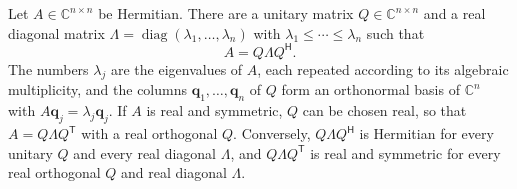 \begin{theorem}
\label{thm:spectral}
Let $A\in\mathbb C^{n\times n}$ be Hermitian. There are a unitary matrix $Q\in\mathbb C^{n\times n}$ and a real diagonal matrix $\Lambda=\operatorname{diag}(\lambda_1,\ldots,\lambda_n)$ with $\lambda_1\le\cdots\le\lambda_n$ such that
\[
A=Q\Lambda Q^{\mathsf H}.
\]
The numbers $\lambda_j$ are the eigenvalues of $A$, each repeated according to its algebraic multiplicity, and the columns $\mathbf q_1,\ldots,\mathbf q_n$ of $Q$ form an orthonormal basis of $\mathbb C^n$ with $A\mathbf q_j=\lambda_j\mathbf q_j$. If $A$ is real and symmetric, $Q$ can be chosen real, so that $A=Q\Lambda Q^{\mathsf T}$ with a real orthogonal $Q$. Conversely, $Q\Lambda Q^{\mathsf H}$ is Hermitian for every unitary $Q$ and every real diagonal $\Lambda$, and $Q\Lambda Q^{\mathsf T}$ is real and symmetric for every real orthogonal $Q$ and real diagonal $\Lambda$.
\end{theorem}

